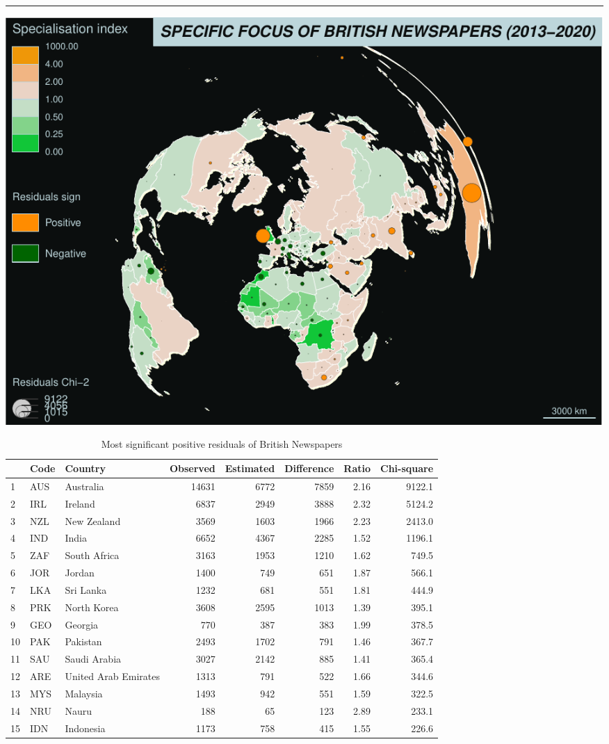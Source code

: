 \documentclass[
]{article}
\begin{document}
\begin{center}\rule{0.5\linewidth}{0.5pt}\end{center}

\includegraphics{Part2_maps_files/figure-latex/unnamed-chunk-19-1.pdf}

\begin{table}

\caption{\label{tab:unnamed-chunk-20}Most significant positive residuals of British Newspapers}
\centering
\begin{tabular}[t]{l|l|l|r|r|r|r|r}
\hline
  & Code & Country & Observed & Estimated & Difference & Ratio & Chi-square\\
\hline
1 & AUS & Australia & 14631 & 6772 & 7859 & 2.16 & 9122.1\\
\hline
2 & IRL & Ireland & 6837 & 2949 & 3888 & 2.32 & 5124.2\\
\hline
3 & NZL & New Zealand & 3569 & 1603 & 1966 & 2.23 & 2413.0\\
\hline
4 & IND & India & 6652 & 4367 & 2285 & 1.52 & 1196.1\\
\hline
5 & ZAF & South Africa & 3163 & 1953 & 1210 & 1.62 & 749.5\\
\hline
6 & JOR & Jordan & 1400 & 749 & 651 & 1.87 & 566.1\\
\hline
7 & LKA & Sri Lanka & 1232 & 681 & 551 & 1.81 & 444.9\\
\hline
8 & PRK & North Korea & 3608 & 2595 & 1013 & 1.39 & 395.1\\
\hline
9 & GEO & Georgia & 770 & 387 & 383 & 1.99 & 378.5\\
\hline
10 & PAK & Pakistan & 2493 & 1702 & 791 & 1.46 & 367.7\\
\hline
11 & SAU & Saudi Arabia & 3027 & 2142 & 885 & 1.41 & 365.4\\
\hline
12 & ARE & United Arab Emirates & 1313 & 791 & 522 & 1.66 & 344.6\\
\hline
13 & MYS & Malaysia & 1493 & 942 & 551 & 1.59 & 322.5\\
\hline
14 & NRU & Nauru & 188 & 65 & 123 & 2.89 & 233.1\\
\hline
15 & IDN & Indonesia & 1173 & 758 & 415 & 1.55 & 226.6\\
\hline
\end{tabular}
\end{table}
\end{document}
